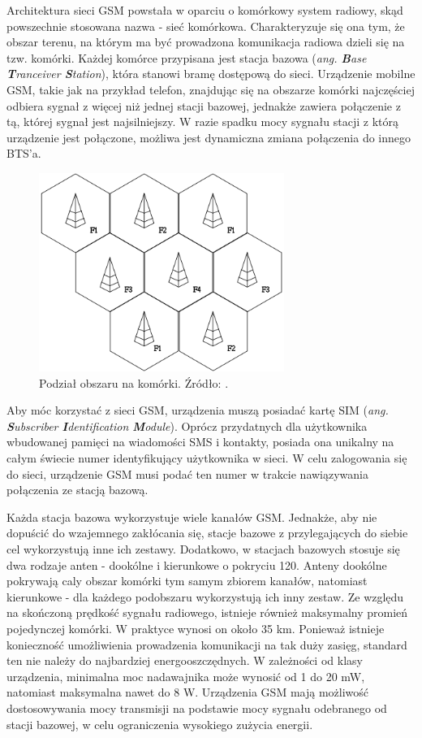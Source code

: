 Architektura sieci GSM powstała w oparciu o komórkowy system radiowy, skąd powszechnie stosowana nazwa - sieć komórkowa. Charakteryzuje się ona tym, że obszar terenu, na którym ma być prowadzona komunikacja radiowa dzieli się na tzw. komórki. Każdej komórce przypisana jest stacja bazowa (\textit{ang. \textbf{B}ase \textbf{T}ranceiver \textbf{S}tation}), która stanowi bramę dostępową do sieci. Urządzenie mobilne GSM, takie jak na przykład telefon, znajdując się na obszarze komórki najczęściej odbiera sygnał z więcej niż jednej stacji bazowej, jednakże zawiera połączenie z tą, której sygnał jest najsilniejszy. W razie spadku mocy sygnału stacji z którą urządzenie jest połączone, możliwa jest dynamiczna zmiana połączenia do innego BTS'a.

\begin{figure}[H]
	\centering
	\includegraphics[width=8cm]{img/theory/GSM/cell_structure.png}
	\caption{Podział obszaru na komórki. Źródło: \cite{GSM_wiki}.}
	\label{fig:image_gsm_cells}
\end{figure}

Aby móc korzystać z sieci GSM, urządzenia muszą posiadać kartę SIM (\textit{ang. \textbf{S}ubscriber \textbf{I}dentification \textbf{M}odule}). Oprócz przydatnych dla użytkownika wbudowanej pamięci na wiadomości SMS i kontakty, posiada ona unikalny na całym świecie numer identyfikujący użytkownika w sieci. W celu zalogowania się do sieci, urządzenie GSM musi podać ten numer w trakcie nawiązywania połączenia ze stacją bazową. 

Każda stacja bazowa wykorzystuje wiele kanałów GSM. Jednakże, aby nie dopuścić do wzajemnego zakłócania się, stacje bazowe z przylegających do siebie cel wykorzystują inne ich zestawy. Dodatkowo, w stacjach bazowych stosuje się dwa rodzaje anten - dookólne i kierunkowe o pokryciu 120\degree. Anteny dookólne pokrywają caly obszar komórki tym samym zbiorem kanałów, natomiast kierunkowe - dla każdego podobszaru wykorzystują ich inny zestaw. Ze względu na skończoną prędkość sygnału radiowego, istnieje również maksymalny promień pojedynczej komórki. W praktyce wynosi on około 35 km. Ponieważ istnieje konieczność umożliwienia prowadzenia komunikacji na tak duży zasięg, standard ten nie należy do najbardziej energooszczędnych. W zależności od klasy urządzenia, minimalna moc nadawajnika może wynosić od 1 do 20 mW, natomiast maksymalna nawet do 8 W. Urządzenia GSM mają możliwość dostosowywania mocy transmisji na podstawie mocy sygnału odebranego od stacji bazowej, w celu ograniczenia wysokiego zużycia energii. 

